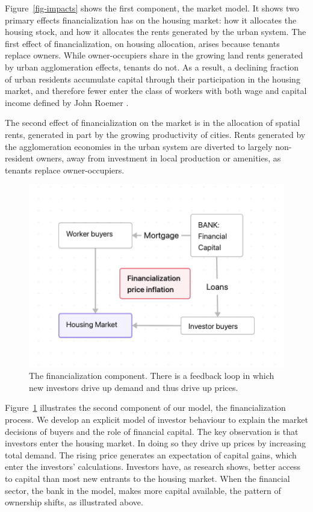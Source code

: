 Figure~\ref{fig-impacts} shows the first component, the market model.
It shows two primary effects financialization has on the housing market: how it allocates
the housing stock, and how it allocates the \glspl{rent} generated by the urban system. 
The first effect of financialization, on housing allocation, arises because tenants replace owners. While owner-occupiers share in the growing land rents generated by urban agglomeration effects, tenants do not. As a result, a declining fraction of urban residents accumulate capital through their participation in the housing market, and therefore fewer enter the class of workers with both wage and capital income defined by John Roemer \cite{roemerGeneralTheoryExploitation1982}. 

The second effect of financialization on the market is in the allocation of spatial rents, generated in part by the growing productivity of cities. Rents generated by the \gls{agglomeration} economies in the urban system are diverted to largely non-resident owners, away from investment in local production or amenities, as tenants replace owner-occupiers.

\begin{figure}[!ht]
\centering
\includegraphics[scale=.70]{fig/flow-financialization.png}
\caption[The financialization component of the model.]{The financialization component. There is a feedback loop in which new investors drive up demand and thus drive up prices.}
\label{fig-financial-cycle}
\end{figure}

Figure~\ref{fig-financial-cycle} illustrates the second component of our model, the financialization process. We develop an explicit model of investor behaviour to explain the market decisions of buyers and the role of financial capital. The key observation is that investors enter the housing market. In doing so they drive up prices by increasing total demand. The rising price generates an expectation of capital gains, which enter the investors' calculations. Investors have, as research shows, better access to capital than most new entrants to the housing market. When the financial sector, the bank in the model, makes more capital available, the pattern of ownership shifts, as illustrated above.


